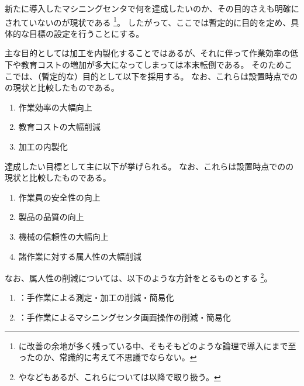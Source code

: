 

新たに導入したマシニングセンタで何を達成したいのか、その目的さえも明確にされていないのが現状である
\footnote{\MMC に改善の余地が多く残っている中、そもそもどのような論理で導入にまで至ったのか、常識的に考えて不思議でならない。}。
したがって、ここでは暫定的に目的を定め、具体的な目標の設定を行うことにする。



主な目的としては\Dimple 加工を内製化することではあるが、それに伴って作業効率の低下や教育コストの増加が多大になってしまっては本末転倒である。
そのためここでは、（暫定的な）目的として以下を採用する。
なお、これらは\DMC 設置時点での\MMC の現状と比較したものである。
\begin{enumerate}[label=\sarrow]
\item 作業効率の大幅向上
\item 教育コストの大幅削減
\item \Dimple 加工の内製化
\end{enumerate}



達成したい目標として主に以下が挙げられる。
なお、これらは\DMC 設置時点での\MMC の現状と比較したものである。
\begin{enumerate}[label=\sarrow]
\item 作業員の安全性の向上
\item 製品の品質の向上
\item 機械の信頼性の大幅向上
\item 諸作業に対する属人性の大幅削減
\end{enumerate}
なお、属人性の削減については、以下のような方針をとるものとする
\footnote{やなどもあるが、これらについては以降で取り扱う。}。
\begin{enumerate}[label=\sarrow]
\item {}：手作業による測定・加工の削減・簡易化
\item {}：手作業によるマシニングセンタ画面操作の削減・簡易化
\end{enumerate}



